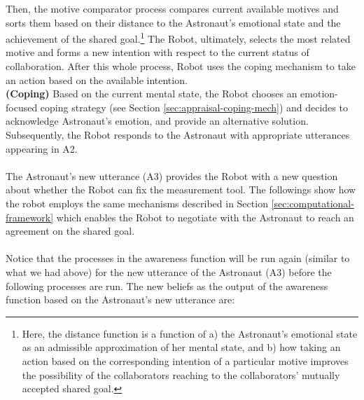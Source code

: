 Then, the motive comparator process compares current available motives and
sorts them based on their distance to the Astronaut's emotional state and
the achievement of the shared goal.\footnote{Here, the distance function is a
function of a) the Astronaut's emotional state as an admissible approximation
of her mental state, and b) how taking an action based on the corresponding
intention of a particular motive improves the possibility of the collaborators
reaching to the collaborators' mutually accepted shared goal.} The Robot,
ultimately, selects the most related motive and forms a new intention with
respect to the current status of collaboration. After this whole process,
Robot uses the coping mechanism to take an action based on the available
intention.\\

\noindent \textbf{(Coping)} Based on the current mental state, the Robot chooses
an emotion-focused coping strategy (see Section \ref{sec:appraisal-coping-mech})
and decides to acknowledge Astronaut's emotion, and provide an alternative
solution. Subsequently, the Robot responds to the Astronaut with appropriate
utterances appearing in A2.\\

\noindent {}\\

The Astronaut's new utterance (A3) provides the Robot with a new question about
whether the Robot can fix the measurement tool. The followings show how the
robot employs the same mechanisms described in Section
\ref{sec:computational-framework} which enables the Robot to negotiate with the
Astronaut to reach an agreement on the shared goal.\\

\noindent{}\\

Notice that the processes in the awareness function will be run again (similar
to what we had above) for the new utterance of the Astronaut (A3) before the
following processes are run. The new beliefs as the output of the awareness
function based on the Astronaut's new utterance are:

